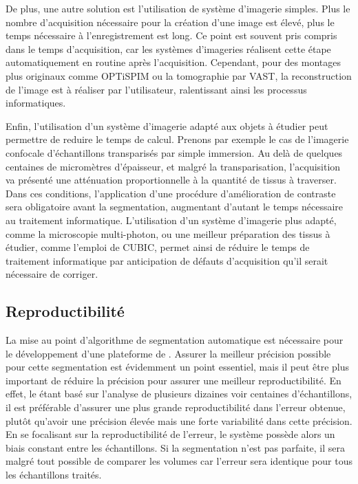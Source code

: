 \documentclass[\main/main.tex]{subfiles}
\begin{document}
%
De plus, une autre solution est l'utilisation de système d'imagerie simples.
%
Plus le nombre d'acquisition nécessaire pour la création d'une image est élevé, plus le temps nécessaire à l'enregistrement est long.
%
Ce point est souvent pris compris dans le temps d'acquisition, car les systèmes d'imageries réalisent cette étape automatiquement en routine après l'acquisition.
%
Cependant, pour des montages plus originaux comme OPTiSPIM ou la tomographie par VAST,
la reconstruction de l'image est à réaliser par l'utilisateur, ralentissant ainsi les processus informatiques.
%

%
Enfin, l'utilisation d'un système d'imagerie adapté aux objets à étudier peut permettre de reduire le temps de calcul.
%
Prenons par exemple le cas de l'imagerie confocale d'échantillons transparisés par simple immersion.
%
Au delà de quelques centaines de micromètres d'épaisseur, et malgré la transparisation, l'acquisition va présenté une atténuation proportionnelle à la quantité de tissus à traverser.
%
Dans ces conditions, l'application d'une procédure d'amélioration de contraste sera obligatoire avant la segmentation, augmentant d'autant le temps nécessaire au traitement informatique.
%
L'utilisation d'un système d'imagerie plus adapté, comme la microscopie multi-photon, ou une meilleur préparation des tissus à étudier, comme l'emploi de CUBIC, permet ainsi de réduire le temps de traitement informatique par anticipation de défauts d'acquisition qu'il serait nécessaire de corriger.

    \subsection{Reproductibilité}

%
La mise au point d'algorithme de segmentation automatique est nécessaire pour le développement d'une plateforme de \hcs{}.
%
Assurer la meilleur précision possible pour cette segmentation est évidemment un point essentiel, mais il peut être plus important de réduire la précision pour assurer une meilleur reproductibilité.
%
En effet, le \hcs{} étant basé sur l'analyse de plusieurs dizaines voir centaines d'échantillons,
il est préférable d'assurer une plus grande reproductibilité dans l'erreur obtenue, plutôt qu'avoir une précision élevée mais une forte variabilité dans cette précision.
%
En se focalisant sur la reproductibilité de l'erreur, le système possède alors un biais constant entre les échantillons.
%
Si la segmentation n'est pas parfaite, il sera malgré tout possible de comparer les volumes car l'erreur sera identique pour tous les échantillons traités.
\end{document}

